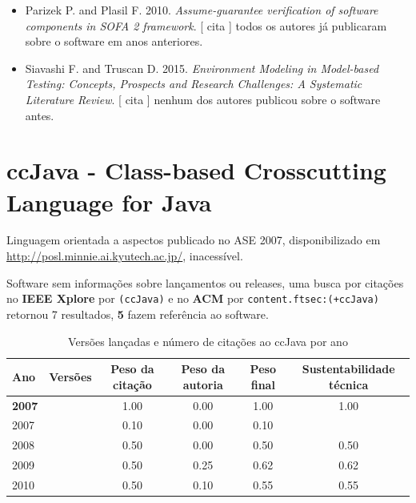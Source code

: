 \begin{itemize}
      [
          cita
          usa
          contribui
      ]
todos os autores já publicaram sobre o software em anos anteriores.
\item Parizek P. and Plasil F.
      2010.
        \textit{ Assume-guarantee verification of software components in SOFA 2 framework}.
      [
          cita
      ]
todos os autores já publicaram sobre o software em anos anteriores.
\item Siavashi F. and Truscan D.
      2015.
        \textit{ Environment Modeling in Model-based Testing: Concepts, Prospects and Research Challenges: A Systematic Literature Review}.
      [
          cita
      ]
nenhum dos autores publicou sobre o software antes.
\end{itemize}
\section{ccJava - Class-based Crosscutting Language for Java}

Linguagem orientada a aspectos
publicado no ASE 2007,
disponibilizado em \url{http://posl.minnie.ai.kyutech.ac.jp/},
inacessível.

Software sem informações sobre lançamentos ou releases,
uma busca por citações no {\bf IEEE Xplore} por
\texttt{(ccJava)}
e no {\bf ACM} por
\texttt{content.ftsec:(+ccJava)}
retornou
7 resultados,
{\bf 5} fazem referência ao software.


\begin{table}[H]
\caption{Versões lançadas e número de citações ao ccJava por ano}
\centering
\begin{tabular}{| l | c | c | c | c | c |}
  \hline
  Ano & Versões & Peso da citação & Peso da autoria & Peso final & Sustentabilidade técnica \\
  \hline
            {\bf 2007}
          &
          
          &
          1.00
          &
          0.00
          &
          1.00
          &
            {\color{blue} 1.00}
          \\
            2007
          &
          
          &
          0.10
          &
          0.00
          &
          0.10
          &
          \\
\hline
            2008
          &
          
          &
          0.50
          &
          0.00
          &
          0.50
          &
            {\color{blue} 0.50}
          \\
\hline
            2009
          &
          
          &
          0.50
          &
          0.25
          &
          0.62
          &
            {\color{blue} 0.62}
          \\
\hline
            2010
          &
          
          &
          0.50
          &
          0.10
          &
          0.55
          &
            {\color{blue} 0.55}
          \\
\hline
\end{tabular}
\end{table}

